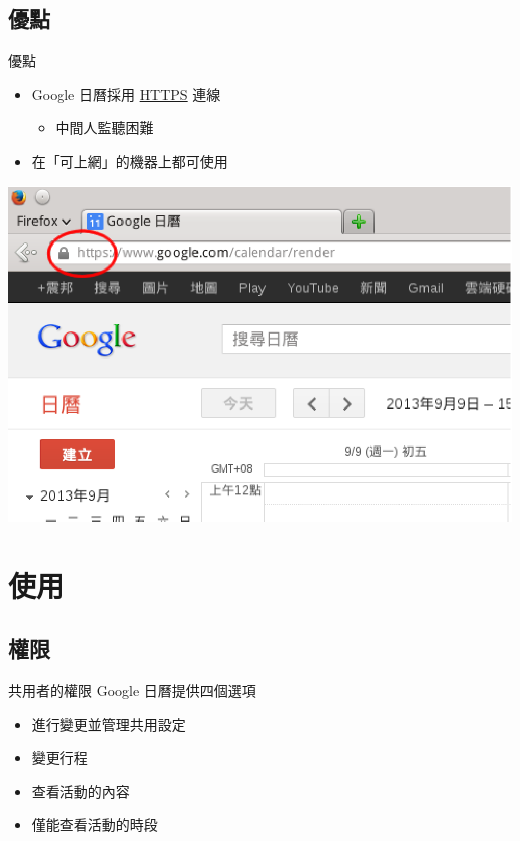 \documentclass{beamer}
\begin{document}
\subsection{優點}
\begin{frame}{優點}
  \begin{itemize}
    \item Google 日曆採用 \href{https://zh.wikipedia.org/wiki/HTTPS}{HTTPS} 連線
    \begin{itemize}
      \item 中間人監聽困難
    \end{itemize}
    \item 在「可上網」的機器上都可使用
  \end{itemize}
  \begin{center}
    \includegraphics[scale=0.5]{https.eps}
  \end{center}
\end{frame}

\section{使用}
\subsection{權限}
\begin{frame}{共用者的權限}
  Google 日曆提供四個選項
  \begin{itemize}
    \item 進行變更並管理共用設定
    \item 變更行程
    \item 查看活動的內容
    \item 僅能查看活動的時段
  \end{itemize}
\end{frame}
\end{document}
